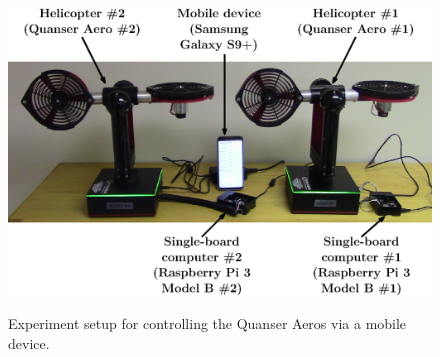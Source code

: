 \begin{figure}[!htbp]
    \centering
    \includegraphics[width=.5\textwidth,keepaspectratio=true]{figs/ipe/Setup.eps}
    \label{fig:Setup}
    \caption{Experiment setup for controlling the Quanser Aeros via a mobile device.}
\end{figure}




